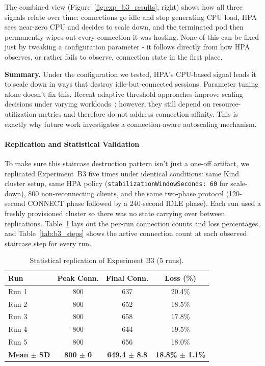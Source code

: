\documentclass[twocolumn]{svjour3}
\begin{document}
The combined view (Figure~\ref{fig:exp_b3_results}, right) shows how all three
signals relate over time: connections go idle and stop generating CPU load, HPA
sees near-zero CPU and decides to scale down, and the terminated pod then
permanently wipes out every connection it was hosting. None of this can be fixed
just by tweaking a configuration parameter - it follows directly from how HPA
observes, or rather fails to observe, connection state in the first place.

\noindent\textbf{Summary.} Under the configuration we tested, HPA's CPU-based
signal leads it to scale down in ways that destroy idle-but-connected sessions.
Parameter tuning alone doesn't fix this. Recent adaptive threshold approaches improve scaling decisions under varying workloads~\cite{pozdniakova2024sla}; however, they still depend on resource-utilization metrics and therefore do not address connection affinity. This is exactly why future work investigates a connection-aware autoscaling mechanism.

\paragraph{Replication and Statistical Validation}
To make sure this staircase destruction pattern isn't just a one-off artifact, we
replicated Experiment~B3 five times under identical conditions: same Kind cluster
setup, same HPA policy (\texttt{stabilizationWindowSeconds: 60} for scale-down),
800 non-reconnecting clients, and the same two-phase protocol (120-second CONNECT
phase followed by a 240-second IDLE phase). Each run used a freshly provisioned
cluster so there was no state carrying over between replications.
Table~\ref{tab:b3_replication} lays out the per-run connection counts and loss
percentages, and Table~\ref{tab:b3_steps} shows the active connection count at
each observed staircase step for every run.

\begin{table}[!ht]
\centering
\caption{Statistical replication of Experiment B3 (5 runs).}
\label{tab:b3_replication}
\begin{tabular*}{\columnwidth}{@{\extracolsep{\fill}}lccc@{}}
\toprule
\textbf{Run} & \textbf{Peak Conn.} & \textbf{Final Conn.} & \textbf{Loss (\%)} \\
\midrule
Run 1 & 800 & 637 & 20.4\% \\
Run 2 & 800 & 652 & 18.5\% \\
Run 3 & 800 & 658 & 17.8\% \\
Run 4 & 800 & 644 & 19.5\% \\
Run 5 & 800 & 656 & 18.0\% \\
\midrule
\textbf{Mean $\pm$ SD} & \textbf{800 $\pm$ 0} & \textbf{649.4 $\pm$ 8.8} & \textbf{18.8\% $\pm$ 1.1\%} \\
\bottomrule
\end{tabular*}
\end{table}
\end{document}
